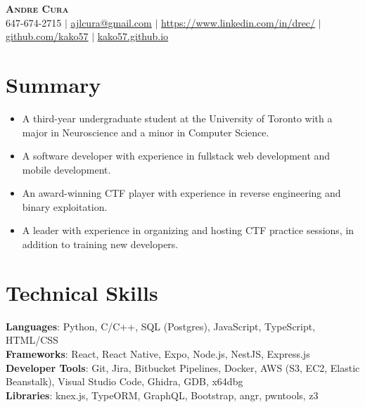 \documentclass[letterpaper,11pt]{article}
\newcommand{\resumeItem}[1]{
  \item\small{
    {#1 \vspace{-2pt}}
  }
}
\newcommand{\resumeItemListStart}{\begin{itemize}}
\newcommand{\resumeItemListEnd}{\end{itemize}\vspace{-5pt}}
\begin{document}

\begin{center}
  \textbf{\Huge \scshape Andre Cura} \\ \vspace{1pt}
  \small 647-674-2715 $|$ \href{mailto:ajlcura@gmail.com}{\underline{ajlcura@gmail.com}} $|$ 
  \href{https://www.linkedin.com/in/drec/}{\underline{https://www.linkedin.com/in/drec/}} $|$
  \href{https://github.com/kako57}{\underline{github.com/kako57}} $|$
  \href{https://kako57.github.io}{\underline{kako57.github.io}}\\
\end{center}

\section{Summary}
  \begin{itemize}[leftmargin=0.15in, label={}]
    \small{\item{
      \resumeItemListStart
        \resumeItem{A third-year undergraduate student at the University of Toronto with a major in Neuroscience and a minor in Computer Science.}
        \resumeItem{A software developer with experience in fullstack web development and mobile development.}
        \resumeItem{An award-winning CTF player with experience in reverse engineering and binary exploitation.}
        \resumeItem{A leader with experience in organizing and hosting CTF practice sessions, in addition to training new developers.}
      \resumeItemListEnd
    }}
  \end{itemize}

\section{Technical Skills}
 \begin{itemize}[leftmargin=0.15in, label={}]
    \small{\item{
      \textbf{Languages}{: Python, C/C++, SQL (Postgres), JavaScript, TypeScript, HTML/CSS} \\
      \textbf{Frameworks}{: React, React Native, Expo, Node.js, NestJS, Express.js} \\
      \textbf{Developer Tools}{: Git, Jira, Bitbucket Pipelines, Docker, AWS (S3, EC2, Elastic Beanstalk), Visual Studio Code, Ghidra, GDB, x64dbg} \\
      \textbf{Libraries}{: knex.js, TypeORM, GraphQL, Bootstrap, angr, pwntools, z3}
    }}
 \end{itemize}
\end{document}
